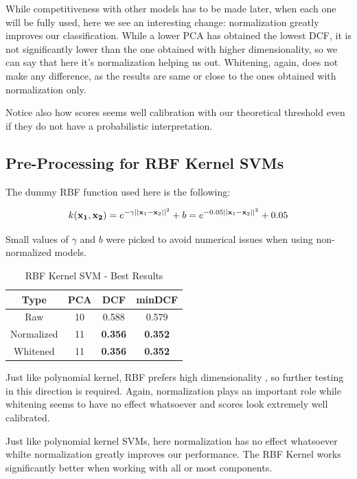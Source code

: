 \documentclass[12pt, twocolumn]{article}
\begin{document}
While competitiveness with other models has to be made later, when each one will be fully used, here we see an interesting change:
normalization greatly improves our classification.
While a lower PCA has obtained the lowest DCF, it is not significantly lower than the one obtained with higher dimensionality, so we can say that here it's normalization helping us out.
Whitening, again, does not make any difference, as the results are same or close to the ones obtained with normalization only.

Notice also how scores seems well calibration with our theoretical threshold even if they do not have a probabilistic interpretation.

\subsection{Pre-Processing for RBF Kernel SVMs}

The dummy RBF function used here is the following:

$$\displaystyle k({\bf x_1}, {\bf x_2}) = e^{-\gamma||{\bf x}_1 - {\bf x}_2||^2} + b = e^{-0.05||{\bf x}_1 - {\bf x}_2||^2} + 0.05 $$

Small values of $\gamma$ and $b$ were picked to avoid numerical issues when using non-normalized models.

\begin{table}[H]
    \centering
        \begin{tabular}{||c|c|c|c||}
            \hline
            Type & PCA & DCF & minDCF \\
            \hline
            \hline
                Raw & 10 & 0.588 & 0.579 \\ 
                Normalized & 11 & {\bf 0.356} & {\bf 0.352} \\ 
                Whitened & 11 & {\bf 0.356} & {\bf 0.352} \\ 
            \hline
    \end{tabular}
    \caption{RBF Kernel SVM - Best Results}
\end{table}

Just like polynomial kernel, RBF prefers high dimensionality , so further testing in this direction is required.
Again, normalization plays an important role while whitening seems to have no effect whatsoever and scores look extremely well calibrated.

Just like polynomial kernel SVMs, here normalization has no effect whatsoever whilte normalization greatly improves our performance.
The RBF Kernel works significantly better when working with all or most components. 
\end{document}
